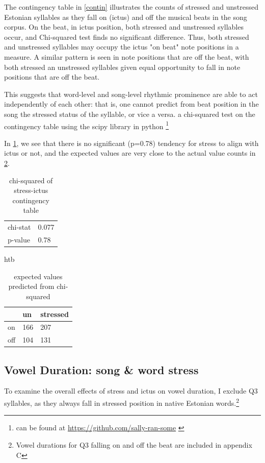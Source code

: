 The contingency table in \ref{contin} illustrates the counts of stressed and unstressed Estonian syllables as they fall on (ictus) and off the musical beats in the song corpus. On the beat, in ictus position, both stressed and unstressed syllables occur, and Chi-squared test finds no significant difference. Thus, both stressed and unstressed syllables may occupy the ictus "on beat" note positions in a measure. A similar pattern is seen in note positions that are off the beat, with both stressed an unstressed syllables given equal opportunity to fall in note positions that are off the beat. 

This suggests that word-level and song-level rhythmic prominence are able to act independently of each other: that is, one cannot predict from beat position in the song the stressed status of the syllable, or vice a versa. 
a chi-squared test on the contingency table using the scipy library in python \citep{2020SciPy-NMeth, mckinney-proc-scipy-2010}\footnote{\citep{reback2020pandas} can be found at \url{https://github.com/sally-ran-some} \citep{Kluyver2016jupyter}}


In \ref{chicont}, we see that there is no significant (p=0.78) tendency for stress to align with ictus or not,  and the expected values are very close to the actual value counts in \ref{chipredict}.


\begin{table}[htb]
\caption{chi-squared of stress-ictus contingency table}
\begin{center}
\begin{tabular}{ll}
\hline
chi-stat & 0.077 \\
p-value &  0.78 \\
\hline
\end{tabular}
\end{center}
\label{chicont}
\end{table}%


\begin{table}{htb}
\caption{expected values predicted from chi-squared}
\centering
\begin{tabular}{lll}
\hline
 				& un 		&   stressed \\
\hline
on	& 166 	& 207 \\
off   				&   104	 & 131 \\
\hline
\end{tabular}
\label{chipredict}
\end{table}



\subsection{Vowel Duration: song \& word stress} 
To examine the overall effects of stress and ictus on vowel duration, I exclude Q3 syllables, as they always fall in stressed position in native Estonian words.\footnote{Vowel durations for Q3 falling on and off the beat are included in appendix C} 

